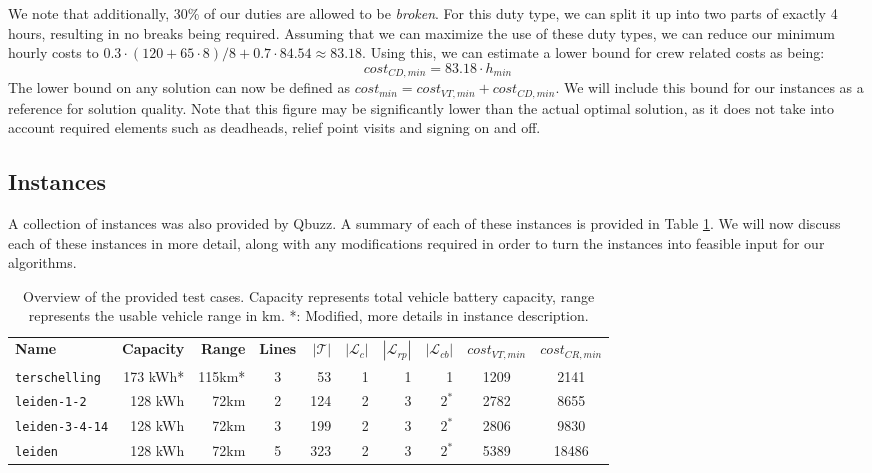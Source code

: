 \documentclass[]{article}
\begin{document}
We note that additionally, 30\% of our duties are allowed to be \textit{broken}. For this duty type, we can split it up into two parts of exactly 4 hours, resulting in no breaks being required. Assuming that we can maximize the use of these duty types, we can reduce our minimum hourly costs to $0.3 \cdot (120 + 65 \cdot 8) / 8 + 0.7 \cdot 84.54 \approx 83.18$. Using this, we can estimate a lower bound for crew related costs as being:
\begin{equation}
  cost_{CD,min} = 83.18 \cdot h_{min} \nonumber
\end{equation}
The lower bound on any solution can now be defined as $cost_{min} = cost_{VT,min} + cost_{CD,min}$. We will include this bound for our instances as a reference for solution quality. Note that this figure may be significantly lower than the actual optimal solution, as it does not take into account required elements such as deadheads, relief point visits and signing on and off.

\subsection{Instances}
A collection of instances was also provided by Qbuzz. A summary of each of these instances is provided in Table \ref{tab:instances}. We will now discuss each of these instances in more detail, along with any modifications required in order to turn the instances into feasible input for our algorithms. 

\begin{table}[h]
  \centering
  \begin{tabular}{lrrcrrrrcc}
    \toprule
       \textbf{Name} & \textbf{Capacity} & \textbf{Range} & \textbf{Lines} & $|\mathcal{T}|$ & $|\mathcal{L}_c|$ & $|\mathcal{L}_{rp}|$ & $|\mathcal{L}_{cb}|$ & $cost_{VT,min}$ & $cost_{CR,min}$ \\
        \cmidrule(lr){1-1}\cmidrule(lr){2-3}\cmidrule(lr){4-8} \cmidrule(lr){9-10}
        \texttt{terschelling}  & 173 kWh* & 115km* & 3 & 53 & 1 & 1 & 1  & 1209 & 2141 \\
        \texttt{leiden-1-2}  & 128 kWh & 72km & 2 & 124 & 2 & 3 & $2^*$  & 2782 & 8655 \\
        \texttt{leiden-3-4-14} & 128 kWh & 72km & 3 & 199 & 2 & 3 & $2^*$  & 2806 & 9830 \\
        \texttt{leiden}  & 128 kWh & 72km & 5 & 323 & 2 & 3 & $2^*$ & 5389 & 18486 \\
        \bottomrule
  \end{tabular}
  \caption{Overview of the provided test cases. Capacity represents total vehicle battery capacity, range represents the usable vehicle range in km. *: Modified, more details in instance description.}
  \label{tab:instances}
\end{table}
\end{document}
